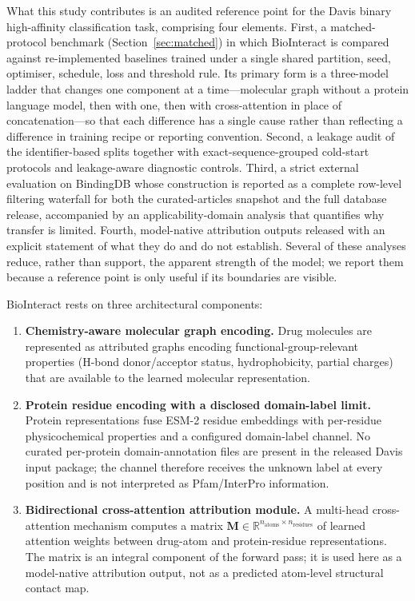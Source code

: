 \documentclass[fleqn,10pt]{wlscirep}
\begin{document}
What this study contributes is an audited reference point for the Davis binary
high-affinity classification task, comprising four elements.  First, a
matched-protocol benchmark (Section~\ref{sec:matched}) in which BioInteract is
compared against re-implemented baselines trained under a single shared
partition, seed, optimiser, schedule, loss and threshold rule.  Its primary form
is a three-model ladder that changes one component at a time---molecular graph
without a protein language model, then with one, then with cross-attention in
place of concatenation---so that each difference has a single cause rather than
reflecting a difference in training recipe or reporting convention.  Second, a leakage audit of the identifier-based
splits together with exact-sequence-grouped cold-start protocols and
leakage-aware diagnostic controls.  Third, a strict external evaluation on
BindingDB whose construction is reported as a complete row-level filtering
waterfall for both the curated-articles snapshot and the full database release,
accompanied by an applicability-domain analysis that quantifies why transfer is
limited.  Fourth, model-native attribution outputs released with an explicit
statement of what they do and do not establish.  Several of these analyses
reduce, rather than support, the apparent strength of the model; we report them
because a reference point is only useful if its boundaries are visible.
\endgroup

BioInteract rests on three architectural components:

\begin{enumerate}[leftmargin=*]
\item \textbf{Chemistry-aware molecular graph encoding.}  Drug molecules are
  represented as attributed graphs encoding functional-group-relevant properties
  (H-bond donor/acceptor status, hydrophobicity, partial charges) that
  are available to the learned molecular representation.

\item \textbf{Protein residue encoding with a disclosed domain-label limit.}
  Protein representations fuse ESM-2 residue embeddings with per-residue
  physicochemical properties and a configured domain-label channel. No curated
  per-protein domain-annotation files are present in the released Davis input
  package; the channel therefore receives the unknown label at every position
  and is not interpreted as Pfam/InterPro information.

\item \textbf{Bidirectional cross-attention attribution module.}  A multi-head
  cross-attention mechanism computes a matrix
  $\mathbf{M} \in \mathbb{R}^{n_\text{atoms} \times n_\text{residues}}$ of
  learned attention weights between drug-atom and protein-residue
  representations.  The matrix is an integral component of the forward pass;
  it is used here as a model-native attribution output, not as a predicted
  atom-level structural contact map.
\end{enumerate}
\end{document}
